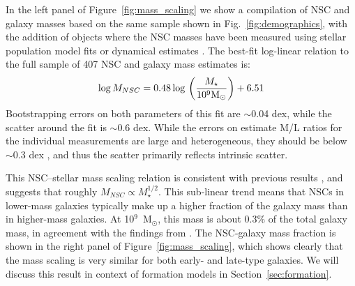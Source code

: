 In the left panel of Figure~\ref{fig:mass_scaling} we show a compilation of NSC and galaxy masses based on the same sample shown in Fig.~\ref{fig:demographics}, with the addition of objects where the NSC masses have been measured using stellar population model fits or dynamical estimates  \citep[plotted as stars;][]{erwin12, nguyen18}.  
The best-fit log-linear relation to the full sample of 407 NSC and galaxy mass estimates is:
\begin{equation}
    {\rm log}\,M_{NSC} = 0.48\,{\rm log}\, \left( \frac{M_\star}{10^9 {\rm M}_\odot} \right) + 6.51
\end{equation}
Bootstrapping errors on both parameters of this fit are $\sim$0.04 dex, while the scatter around the fit is $\sim$0.6 dex.  While the errors on estimate M/L ratios for the individual measurements are large and heterogeneous, they should be below $\sim$0.3 dex \citep{roediger15}, and thus the scatter primarily reflects intrinsic scatter.  

This NSC--stellar mass scaling relation is consistent with 
previous results \citep{balcells03,scott13,denbrok14,sanchez-janssen19}, and suggests that roughly $M_{NSC} \propto M_\star^{1/2}$.  This sub-linear trend means that NSCs in lower-mass galaxies typically make up a higher fraction of the galaxy mass than in higher-mass galaxies.  At 10$^9$~M$_
\odot$, this mass is about 0.3\% of the total galaxy mass, in agreement with the findings from \citet{cote06}.  The NSC-galaxy mass fraction is shown in the right panel of Figure~\ref{fig:mass_scaling}, which shows clearly that the mass scaling is very similar for both early- and late-type galaxies.  We will discuss this result in context of formation models in Section~\ref{sec:formation}.   

